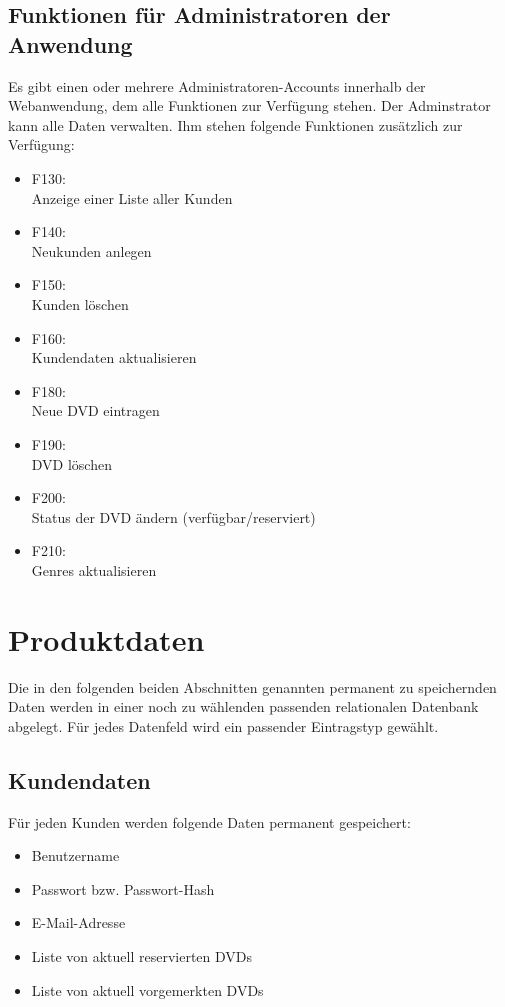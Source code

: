 \documentclass[12pt,oneside,a4paper,bibtotoc,liststotoc,pointlessnumbers]{scrartcl}
\begin{document}
\subsection{Funktionen für Administratoren der Anwendung}
Es gibt einen oder mehrere Administratoren-Accounts innerhalb der Webanwendung, dem alle Funktionen zur Verfügung stehen. Der Adminstrator kann alle Daten verwalten. Ihm stehen folgende Funktionen zusätzlich zur Verfügung:
\begin{itemize}
\item F130: \\Anzeige einer Liste aller Kunden
\item F140: \\Neukunden anlegen
\item F150: \\Kunden löschen
\item F160: \\Kundendaten aktualisieren
\item F180: \\Neue DVD eintragen \newpage
\item F190: \\DVD löschen
\item F200: \\Status der DVD ändern (verfügbar/reserviert)
\item F210: \\Genres aktualisieren
\end{itemize}
\newpage
\section{Produktdaten}
Die in den folgenden beiden Abschnitten genannten permanent zu speichernden Daten werden in einer noch zu wählenden passenden relationalen Datenbank abgelegt. Für jedes Datenfeld wird ein passender Eintragstyp gewählt.
\subsection{Kundendaten}
Für jeden Kunden werden folgende Daten permanent gespeichert:
\begin{itemize}
\item Benutzername
\item Passwort bzw. Passwort-Hash
\item E-Mail-Adresse
\item Liste von aktuell reservierten DVDs
\item Liste von aktuell vorgemerkten DVDs
\end{itemize}
\end{document}

